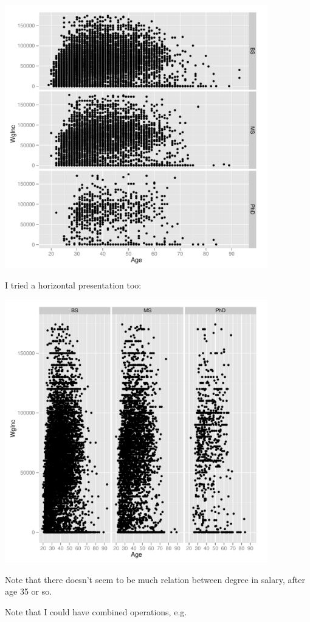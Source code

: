 \includegraphics[bb=0 0 504 504,width=4.5in]{FacetVertAgeInc.pdf}

I tried a horizontal presentation too:

\includegraphics[bb=0 0 504 504,width=4.5in]{FacetHorizAgeInc.pdf}

Note that there doesn't seem to be much relation between degree in
salary, after age 35 or so.

Note that I could have combined operations, e.g.


